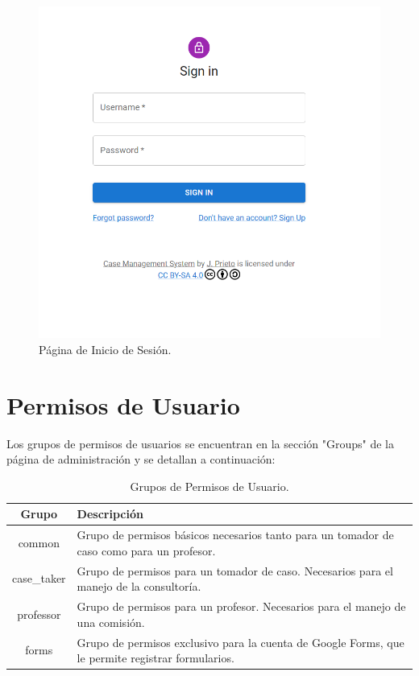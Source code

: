 \begin{figure}[H]
    \centering
    \includegraphics[width=0.7\linewidth]{fig/signin-real-page.png}
    \caption{Página de Inicio de Sesión.}
    \label{fig:signin-real-page-2}
\end{figure}



\section{Permisos de Usuario}\label{sec:permisos-usuarios}

Los grupos de permisos de usuarios se encuentran en la sección "Groups" de la página de administración y se detallan a continuación:

\begin{table}[H]
    \centering
    \begin{tabular}{|c|p{10cm}|}
        \hline
        \textbf{Grupo} & \textbf{Descripción}\\
        \hline
        common & Grupo de permisos básicos necesarios tanto para un tomador de caso como para un profesor.\\
        \hline
        case\_taker & Grupo de permisos para un tomador de caso. Necesarios para el manejo de la consultoría.\\
        \hline
        professor & Grupo de permisos para un profesor. Necesarios para el manejo de una comisión.\\
        \hline
        forms & Grupo de permisos exclusivo para la cuenta de Google Forms, que le permite registrar formularios.\\
        \hline
    \end{tabular}
    \caption{Grupos de Permisos de Usuario.}
    \label{tab:grupos-permisos-usuario}
\end{table}

